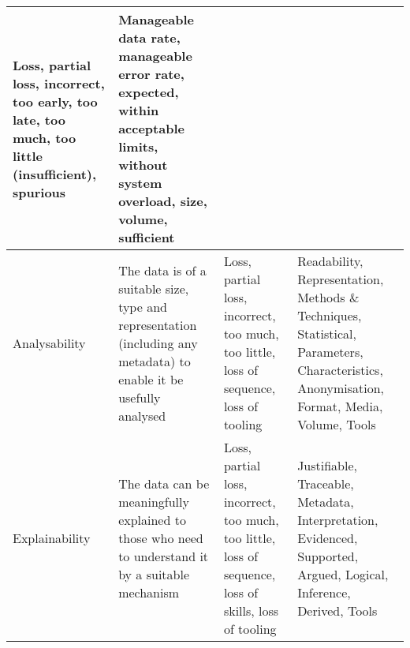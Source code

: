 \begin{longtable}{|L{}|L{}|L{}|L{}|}
  {Loss, partial loss, incorrect, too early, too late, too much, too little (insufficient), spurious} &
  Manageable data rate, manageable error rate, expected, within acceptable limits, without system overload, size, volume, sufficient\\
  \hline
  Analysability &
  The data is of a suitable size, type and representation (including any metadata) to enable it be usefully analysed &
  {Loss, partial loss, incorrect, too much, too little, loss of sequence, loss of tooling} &
  Readability, Representation, Methods \& Techniques, Statistical, Parameters, Characteristics, Anonymisation, Format, Media, Volume, Tools
  \\
  \hline
  Explainability &
  The data can be meaningfully explained to those who need to understand it by a suitable mechanism &
  {Loss, partial loss, incorrect, too much, too little, loss of sequence, loss of skills, loss of tooling} &
  Justifiable, Traceable, Metadata, Interpretation, Evidenced, Supported, Argued, Logical, Inference, Derived, Tools
  \\
  \hline
\end{longtable}
